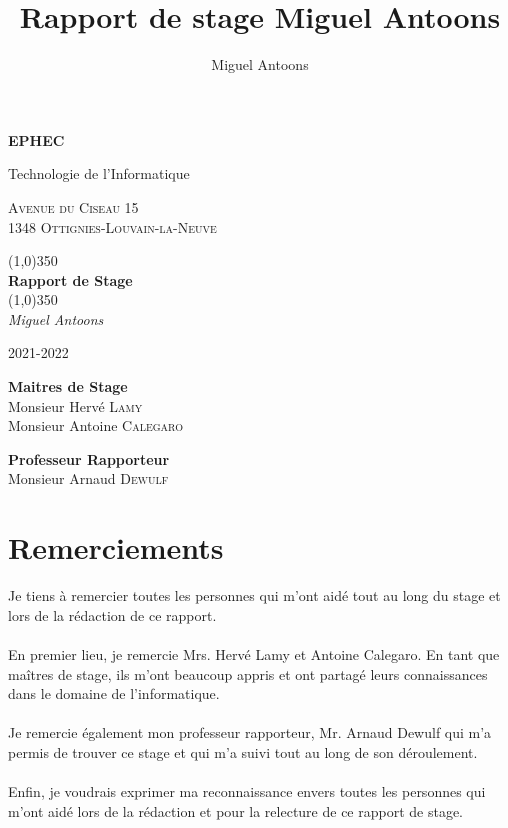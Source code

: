 \documentclass[11pt]{article}
\title{Rapport de stage Miguel Antoons}
\author{Miguel Antoons}
\begin{document}
\begin{titlepage}
    \begin{center}
        \LARGE
        \textbf{EPHEC}

        \vspace{0.1cm}
        \LARGE
        Technologie de l'Informatique

        \large
        \vspace{1.5cm}
        \textsc{Avenue du Ciseau 15}\\
        \textsc{1348 Ottignies-Louvain-la-Neuve}


        \line(1,0){350}\\
        \Huge
        \textbf{Rapport de Stage}\\
        \line(1,0){350}\\

        \vspace{0.5cm}
        \Large
        \textit{Miguel Antoons}

        \vspace{0.5cm}
        \large
        2021-2022

        \vspace{2.5cm}
        \large
        \textbf{Maitres de Stage}
        \vspace{0.2cm}\\
        Monsieur Hervé \textsc{Lamy}\\
        Monsieur Antoine \textsc{Calegaro}

        \vspace{2.5cm}
        \large
        \textbf{Professeur Rapporteur}
        \vspace{0.2cm}\\
        Monsieur Arnaud \textsc{Dewulf}


    \end{center}
\end{titlepage}

\tableofcontents

\newpage

\section{Remerciements}
Je tiens à remercier toutes les personnes qui m'ont aidé tout au long du stage et lors de la rédaction de ce rapport.\\
\\
En premier lieu, je remercie Mrs. Hervé Lamy et Antoine Calegaro. En tant que maîtres de stage, ils m'ont beaucoup appris et ont partagé leurs connaissances dans le domaine de l'informatique.\\
\\
Je remercie également mon professeur rapporteur, Mr. Arnaud Dewulf qui m'a permis de trouver ce stage et qui m'a suivi tout au long de son déroulement.\\
\\
Enfin, je voudrais exprimer ma reconnaissance envers toutes les personnes qui m'ont aidé lors de la rédaction et pour la relecture de ce rapport de stage.
\end{document}
